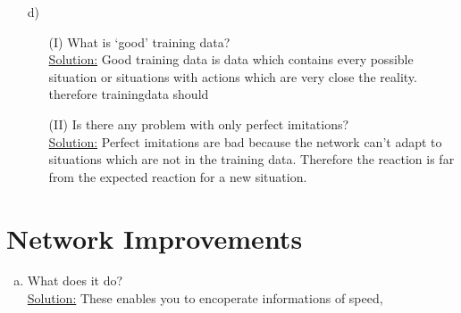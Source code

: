 \documentclass[DIN, pagenumber=false, fontsize=11pt, parskip=half]{scrartcl}
\newcommand{\sol}{\underline{Solution:} }
\begin{document}
\begin{enumerate}[b)]
	changing the hyper-parameters? Can you explain this?\\\sol
	Yes, it can be archived. As you change the Hyperparameter, you change the behaviour or the calculation of the network. Therefore it is possible, that you can optimize by changing them.\\
	Low learningrate with few epochs results in a bad learning.
	\item[d)] \begin{enumerate}
		\item[(I)] What is ‘good’ training data? \\\sol
		Good training data is data which contains every possible situation or situations with actions which are very close the reality. therefore trainingdata should 
		\item[(II)] Is there any problem with only perfect imitations?\\\sol
		Perfect imitations are bad because the network can't adapt to situations which are not in the training data. Therefore the reaction is far from the expected reaction for a new situation.
	\end{enumerate}
\end{enumerate}
\section{Network Improvements}
\begin{enumerate}[a)]
	\item What does it do?\\\sol These enables you to encoperate informations of speed,
\end{enumerate}
\end{document}
